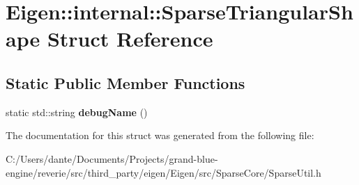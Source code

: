\hypertarget{struct_eigen_1_1internal_1_1_sparse_triangular_shape}{}\section{Eigen\+::internal\+::Sparse\+Triangular\+Shape Struct Reference}
\label{struct_eigen_1_1internal_1_1_sparse_triangular_shape}
\subsection*{Static Public Member Functions}
\begin{DoxyCompactItemize}
\item 
\mbox{\label{struct_eigen_1_1internal_1_1_sparse_triangular_shape_a9deaef710030116d04eeb881602befe9}} 
static std\+::string {\bfseries debug\+Name} ()
\end{DoxyCompactItemize}


The documentation for this struct was generated from the following file\+:\begin{DoxyCompactItemize}
\item 
C\+:/\+Users/dante/\+Documents/\+Projects/grand-\/blue-\/engine/reverie/src/third\+\_\+party/eigen/\+Eigen/src/\+Sparse\+Core/Sparse\+Util.\+h\end{DoxyCompactItemize}
